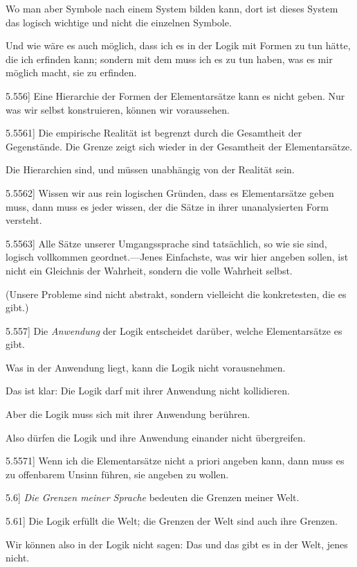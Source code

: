 \documentclass[12pt,oneside]{book}[2007/10/19]
\newcommand{\PropERef}[1]{\hyperref[PropE:#1]{#1}}
\newcommand{\PropositionG}[2]{%
  \item[\phantomsection\label{PropG:#1}\PropERef{#1}] #2%
}
\newcommand{\Emph}[1]{\emph{#1}}%
\begin{document}
\begin{propositions}
{Wo man aber Symbole nach einem System
bilden kann, dort ist dieses System das logisch
wichtige und nicht die einzelnen Symbole.

Und wie wäre es auch möglich, dass ich es in
der Logik mit Formen zu tun hätte, die ich erfinden
kann; sondern mit dem muss ich es zu tun haben,
was es mir möglich macht, sie zu erfinden.}


\PropositionG{5.556}
{Eine Hierarchie der Formen der Elementarsätze
kann es nicht geben. Nur was wir selbst
konstruieren, können wir voraussehen.}


\PropositionG{5.5561}
{Die empirische Realität ist begrenzt durch die
Gesamtheit der Gegenstände. Die Grenze zeigt
sich wieder in der Gesamtheit der Elementarsätze.

Die Hierarchien sind, und müssen unabhängig
von der Realität sein.}


\PropositionG{5.5562}
{Wissen wir aus rein logischen Gründen, dass
es Elementarsätze geben muss, dann muss es jeder
wissen, der die Sätze in ihrer unanalysierten Form
versteht.}


\PropositionG{5.5563}
{Alle Sätze unserer Umgangssprache sind tatsächlich,
so wie sie sind, logisch vollkommen geordnet.---Jenes
Einfachste, was wir hier angeben sollen,
ist nicht ein Gleichnis der Wahrheit, sondern die
volle Wahrheit selbst.

(Unsere Probleme sind nicht abstrakt, sondern
vielleicht die konkretesten, die es gibt.)}


\PropositionG{5.557}
{Die \Emph{Anwendung} der Logik entscheidet
darüber, welche Elementarsätze es gibt.

Was in der Anwendung liegt, kann die Logik
nicht vorausnehmen.

Das ist klar: Die Logik darf mit ihrer Anwendung
nicht kollidieren.

Aber die Logik muss sich mit ihrer Anwendung
berühren.

Also dürfen die Logik und ihre Anwendung
einander nicht übergreifen.}


\PropositionG{5.5571}
{Wenn ich die Elementarsätze nicht a priori
angeben kann, dann muss es zu offenbarem Unsinn
führen, sie angeben zu wollen.}


\PropositionG{5.6}
{\Emph{Die Grenzen meiner Sprache} bedeuten
die Grenzen meiner Welt.}


\PropositionG{5.61}
{Die Logik erfüllt die Welt; die Grenzen der
Welt sind auch ihre Grenzen.

Wir können also in der Logik nicht sagen: Das
und das gibt es in der Welt, jenes nicht.

}
\end{propositions}
\end{document}
